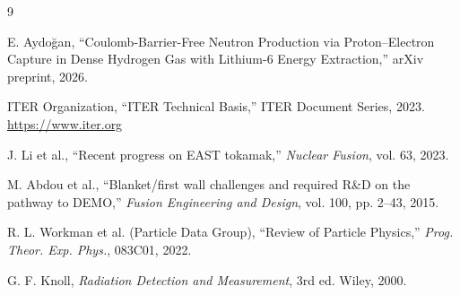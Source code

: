 \documentclass[12pt,a4paper]{article}
\begin{document}
\begin{thebibliography}{9}

  E. Aydoğan,
  ``Coulomb-Barrier-Free Neutron Production via Proton--Electron
  Capture in Dense Hydrogen Gas with Lithium-6 Energy Extraction,''
  arXiv preprint, 2026.

  ITER Organization,
  ``ITER Technical Basis,''
  ITER Document Series, 2023.
  \url{https://www.iter.org}

  J. Li et al.,
  ``Recent progress on EAST tokamak,''
  \textit{Nuclear Fusion}, vol. 63, 2023.

  M. Abdou et al.,
  ``Blanket/first wall challenges and required R\&D on the pathway
  to DEMO,''
  \textit{Fusion Engineering and Design}, vol. 100, pp. 2--43, 2015.

  R. L. Workman et al. (Particle Data Group),
  ``Review of Particle Physics,''
  \textit{Prog. Theor. Exp. Phys.}, 083C01, 2022.

  G. F. Knoll,
  \textit{Radiation Detection and Measurement}, 3rd ed.
  Wiley, 2000.

\end{thebibliography}
\end{document}
